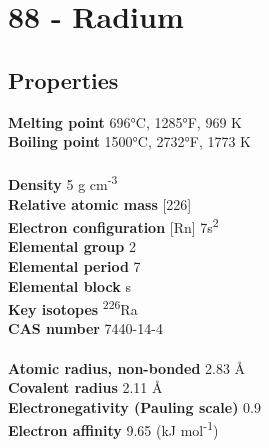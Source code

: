 \section{88 - Radium}
\label{sec:elem-radium}
\subsection{Properties}
\textbf{Melting point} 696°C, 1285°F, 969 K\\
\textbf{Boiling point} 1500°C, 2732°F, 1773 K\\
\\
\textbf{Density} 5 g cm\textsuperscript{-3}\\
\textbf{Relative atomic mass} [226]\\
\textbf{Electron configuration} [Rn] 7s\textsuperscript{2}\\
\textbf{Elemental group} 2\\
\textbf{Elemental period} 7\\
\textbf{Elemental block} s\\
\textbf{Key isotopes} \textsuperscript{226}Ra\\
\textbf{CAS number} 7440-14-4\\
\\
\textbf{Atomic radius, non-bonded} 2.83 Å\\
\textbf{Covalent radius} 2.11 Å\\
\textbf{Electronegativity (Pauling scale)} 0.9\\
\textbf{Electron affinity} 9.65 (kJ mol\textsuperscript{-1})\\